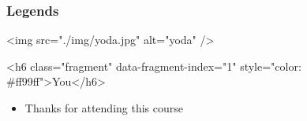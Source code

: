 \documentclass{../c-lecture}
\begin{document}
\begin{frame}
  \frametitle{Legends}
  <img src="./img/yoda.jpg" alt="yoda" />
\end{frame}
\begin{frame}
  <h6 class="fragment" data-fragment-index="1" style="color: #ff99ff">You</h6>
  \begin{itemize}
    \item Thanks for attending this course
  \end{itemize}
\end{frame}
\end{document}
